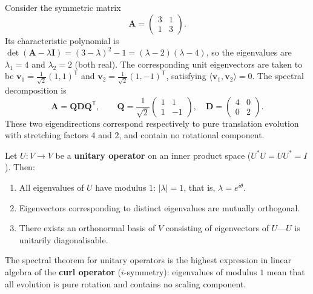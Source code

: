 \begin{example}\label{ch5_example_eigendecomp_2x2}
Consider the symmetric matrix
\[
\mathbf{A} = \begin{pmatrix} 3 & 1 \\ 1 & 3 \end{pmatrix}.
\]
Its characteristic polynomial is $\det(\mathbf{A}-\lambda\mathbf{I}) = (3-\lambda)^2 - 1 = (\lambda-2)(\lambda-4)$, so the eigenvalues are $\lambda_1 = 4$ and $\lambda_2 = 2$ (both real). The corresponding unit eigenvectors are taken to be $\mathbf{v}_1 = \frac{1}{\sqrt2}(1,1)^{\mathsf T}$ and $\mathbf{v}_2 = \frac{1}{\sqrt2}(1,-1)^{\mathsf T}$, satisfying $\langle \mathbf{v}_1, \mathbf{v}_2 \rangle = 0$. The spectral decomposition is
\[
\mathbf{A} = \mathbf{Q}\mathbf{D}\mathbf{Q}^{\mathsf T}, \qquad \mathbf{Q} = \frac{1}{\sqrt2}\begin{pmatrix} 1 & 1 \\ 1 & -1 \end{pmatrix}, \quad \mathbf{D} = \begin{pmatrix} 4 & 0 \\ 0 & 2 \end{pmatrix}.
\]
These two eigendirections correspond respectively to pure translation evolution with stretching factors $4$ and $2$, and contain no rotational component.
\end{example}

\begin{theorem}\label{thm:spectral_theorem_unitary}
Let $U: V \to V$ be a \textbf{unitary operator} on an inner product space ($U^* U = U U^* = I$). Then:
\begin{enumerate}[label=(\roman*)]
    \item All eigenvalues of $U$ have modulus $1$: $|\lambda| = 1$, that is, $\lambda = e^{i\theta}$.
    \item Eigenvectors corresponding to distinct eigenvalues are mutually orthogonal.
    \item There exists an orthonormal basis of $V$ consisting of eigenvectors of $U$---$U$ is unitarily diagonalisable.
\end{enumerate}
The spectral theorem for unitary operators is the highest expression in linear algebra of the \textbf{curl operator} ($i$-symmetry): eigenvalues of modulus $1$ mean that all evolution is pure rotation and contains no scaling component.
\end{theorem}

